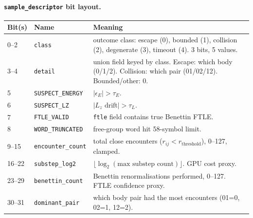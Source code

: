\documentclass[11pt]{report}
\begin{document}
\paragraph{\texttt{sample\_descriptor} bit layout.}
\begin{center}
\begin{tabular}{llp{8.5cm}}
\toprule
Bit(s) & Name & Meaning \\
\midrule
0--2 & \texttt{class} & outcome class: escape (0), bounded (1), collision (2), degenerate (3), timeout (4). 3 bits, 5 values. \\
3--4 & \texttt{detail} & union field keyed by class. Escape: which body (0/1/2). Collision: which pair (01/02/12). Bounded/other: 0. \\
5 & \texttt{SUSPECT\_ENERGY} & $|\epsilon_E|>\tau_E$. \\
6 & \texttt{SUSPECT\_LZ} & $|L_z\text{ drift}|>\tau_L$. \\
7 & \texttt{FTLE\_VALID} & \texttt{ftle} field contains true Benettin FTLE. \\
8 & \texttt{WORD\_TRUNCATED} & free-group word hit 58-symbol limit. \\
9--15 & \texttt{encounter\_count} & total close encounters ($r_{ij}<r_{\mathrm{threshold}}$), 0--127, clamped. \\
16--22 & \texttt{substep\_log2} & $\lfloor\log_2(\text{max substep count})\rfloor$. GPU cost proxy. \\
23--29 & \texttt{benettin\_count} & Benettin renormalisations performed, 0--127. FTLE confidence proxy. \\
30--31 & \texttt{dominant\_pair} & which body pair had the most encounters (01=0, 02=1, 12=2). \\
\bottomrule
\end{tabular}
\end{center}
\end{document}
